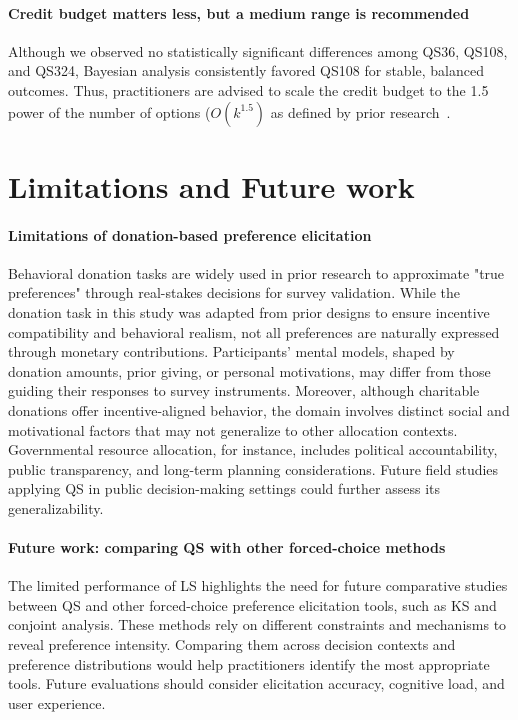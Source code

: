 \paragraph{Credit budget matters less, but a medium range is recommended}
Although we observed no statistically significant differences among QS36, QS108, and QS324, Bayesian analysis consistently favored QS108 for stable, balanced outcomes. Thus, practitioners are advised to scale the credit budget to the 1.5 power of the number of options ($O(k^{1.5})$ as defined by prior research~\cite{chengCanShowWhat2021}.

\section{Limitations and Future work}
\label{sec:limitations}

\paragraph{Limitations of donation-based preference elicitation}
Behavioral donation tasks are widely used in prior research to approximate "true preferences" through real-stakes decisions for survey validation. While the donation task in this study was adapted from prior designs to ensure incentive compatibility and behavioral realism, not all preferences are naturally expressed through monetary contributions. Participants' mental models, shaped by donation amounts, prior giving, or personal motivations, may differ from those guiding their responses to survey instruments. Moreover, although charitable donations offer incentive-aligned behavior, the domain involves distinct social and motivational factors that may not generalize to other allocation contexts. Governmental resource allocation, for instance, includes political accountability, public transparency, and long-term planning considerations. Future field studies applying QS in public decision-making settings could further assess its generalizability.

\paragraph{Future work: comparing QS with other forced-choice methods}
The limited performance of LS highlights the need for future comparative studies between QS and other forced-choice preference elicitation tools, such as KS and conjoint analysis. These methods rely on different constraints and mechanisms to reveal preference intensity. Comparing them across decision contexts and preference distributions would help practitioners identify the most appropriate tools. Future evaluations should consider elicitation accuracy, cognitive load, and user experience.
